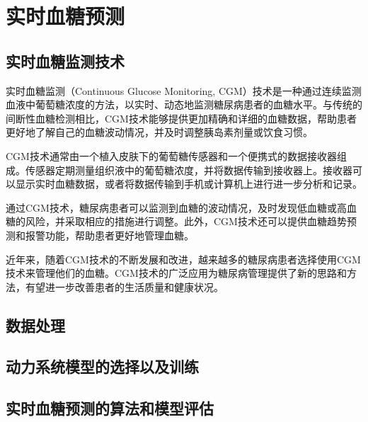 \chapter{实时血糖预测}\label{chap:predict}
\section{实时血糖监测技术}
实时血糖监测（Continuous Glucose Monitoring, CGM）技术是一种通过连续监测血液中葡萄糖浓度的方法，以实时、动态地监测糖尿病患者的血糖水平。与传统的间断性血糖检测相比，CGM技术能够提供更加精确和详细的血糖数据，帮助患者更好地了解自己的血糖波动情况，并及时调整胰岛素剂量或饮食习惯。

CGM技术通常由一个植入皮肤下的葡萄糖传感器和一个便携式的数据接收器组成。传感器定期测量组织液中的葡萄糖浓度，并将数据传输到接收器上。接收器可以显示实时血糖数据，或者将数据传输到手机或计算机上进行进一步分析和记录。

通过CGM技术，糖尿病患者可以监测到血糖的波动情况，及时发现低血糖或高血糖的风险，并采取相应的措施进行调整。此外，CGM技术还可以提供血糖趋势预测和报警功能，帮助患者更好地管理血糖\cite{vigersky2017role}。

近年来，随着CGM技术的不断发展和改进，越来越多的糖尿病患者选择使用CGM技术来管理他们的血糖。CGM技术的广泛应用为糖尿病管理提供了新的思路和方法，有望进一步改善患者的生活质量和健康状况。
\section{数据处理}

\section{动力系统模型的选择以及训练}
\section{实时血糖预测的算法和模型评估}